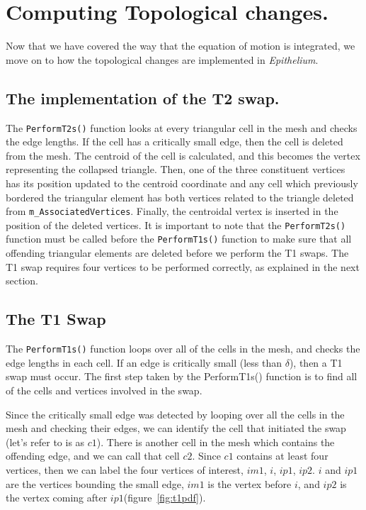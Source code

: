 \section{Computing Topological changes.}
Now that we have covered the way that the equation of motion is integrated, we move on to how the topological changes are implemented in \emph{Epithelium}.  

\subsection{The implementation of the T2 swap.}
The \texttt{PerformT2s()} function looks at every triangular cell in the mesh and checks the edge lengths. If the cell has a critically small edge, then the cell is deleted from the mesh. The centroid of the cell is calculated, and this becomes the vertex representing the collapsed triangle. Then, one of the three constituent vertices has its position updated to the centroid coordinate and any cell which previously bordered the triangular element has both vertices related to the triangle deleted from \texttt{m\_AssociatedVertices}. Finally, the centroidal vertex is inserted in the position of the deleted vertices. It is important to note that the \texttt{PerformT2s()} function must be called before the \texttt{PerformT1s()} function to make sure that all offending triangular elements are deleted before we perform the T1 swaps. The T1 swap requires four vertices to be performed correctly, as explained in the next section.

\subsection{The T1 Swap}
The \texttt{PerformT1s()} function loops over all of the cells in the mesh, and checks the edge lengths in each cell. If an edge is critically small (less than $\delta$), then a T1 swap must occur. The first step taken by the PerformT1s() function is to find all of the cells and vertices involved in the swap.

Since the critically small edge was detected by looping over all the cells in the mesh and checking their edges, we can identify the cell that initiated the swap (let's refer to is as $c1$). There is another cell in the mesh which contains the offending edge, and we can call that cell $c2$. Since $c1$ contains at least four vertices, then we can label the four vertices of interest, $im1$, $i$, $ip1$, $ip2$. $i$ and $ip1$ are the vertices bounding the small edge, $im1$ is the vertex before $i$, and $ip2$ is the vertex coming after $ip1$(figure~\ref{fig:t1pdf}).

